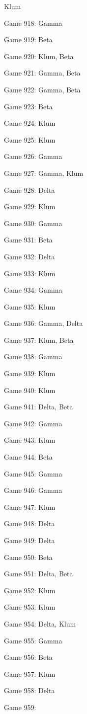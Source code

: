 \documentclass{article}
\begin{document}
\begin{multicols}{3}
\begin{compactitem}
Klum
\item Game 918:
Gamma
\item Game 919:
Beta
\item Game 920:
Klum, Beta
\item Game 921:
Gamma, Beta
\item Game 922:
Gamma, Beta
\item Game 923:
Beta
\item Game 924:
Klum
\item Game 925:
Klum
\item Game 926:
Gamma
\item Game 927:
Gamma, Klum
\item Game 928:
Delta
\item Game 929:
Klum
\item Game 930:
Gamma
\item Game 931:
Beta
\item Game 932:
Delta
\item Game 933:
Klum
\item Game 934:
Gamma
\item Game 935:
Klum
\item Game 936:
Gamma, Delta
\item Game 937:
Klum, Beta
\item Game 938:
Gamma
\item Game 939:
Klum
\item Game 940:
Klum
\item Game 941:
Delta, Beta
\item Game 942:
Gamma
\item Game 943:
Klum
\item Game 944:
Beta
\item Game 945:
Gamma
\item Game 946:
Gamma
\item Game 947:
Klum
\item Game 948:
Delta
\item Game 949:
Delta
\item Game 950:
Beta
\item Game 951:
Delta, Beta
\item Game 952:
Klum
\item Game 953:
Klum
\item Game 954:
Delta, Klum
\item Game 955:
Gamma
\item Game 956:
Beta
\item Game 957:
Klum
\item Game 958:
Delta
\item Game 959:

\end{compactitem}
\end{multicols}
\end{document}
